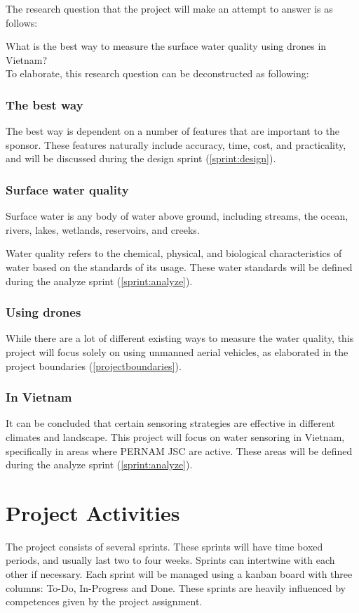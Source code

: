 \documentclass[11pt, a4paper]{article}
\begin{document}
The research question that the project will make an attempt to answer is as follows:\vspace{3mm}

\large{What is the best way to measure the surface water quality using drones in Vietnam?}\vspace{3mm}\\
\normalsize
To elaborate, this research question can be deconstructed as following:
\subsubsection{The best way}
The best way is dependent on a number of features that are important to the sponsor. These features naturally include accuracy, time, cost, and practicality, and will be discussed during the design sprint (\ref{sprint:design}).

\subsubsection{Surface water quality}
Surface water is any body of water above ground, including streams, the ocean, rivers, lakes, wetlands, reservoirs, and creeks.\cite{surfacewater}

Water quality refers to the chemical, physical, and biological characteristics of water based on the standards of its usage. These water standards will be defined during the analyze sprint (\ref{sprint:analyze}).

\subsubsection{Using drones}
While there are a lot of different existing ways to measure the water quality, this project will focus solely on using unmanned aerial vehicles, as elaborated in the project boundaries (\ref{projectboundaries}).

\subsubsection{In Vietnam}
It can be concluded that certain sensoring strategies are effective in different climates and landscape. This project will focus on water sensoring in Vietnam, specifically in areas where PERNAM JSC are active. These areas will be defined during the analyze sprint (\ref{sprint:analyze}).

\section{Project Activities}
The project consists of several sprints. These sprints will have time boxed periods, and usually last two to four weeks. Sprints can intertwine with each other if necessary. Each sprint will be managed using a kanban \cite{kanban} board with three columns: To-Do, In-Progress and Done. These sprints are heavily influenced by competences given by the project assignment. \cite{assignmentform}
\end{document}
